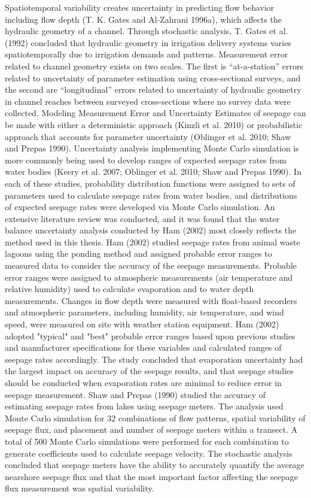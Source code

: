 \begin{linenumbers}
Spatiotemporal variability creates uncertainty in predicting flow behavior including flow depth (T. K. Gates and Al-Zahrani 1996a), which affects the hydraulic geometry of a channel.  Through stochastic analysis, T. Gates et al. (1992) concluded that hydraulic geometry in irrigation delivery systems varies spatiotemporally due to irrigation demands and patterns.
Measurement error related to channel geometry exists on two scales.  The first is “at-a-station” errors related to uncertainty of parameter estimation using cross-sectional surveys, and the second are “longitudinal” errors related to uncertainty of hydraulic geometry in channel reaches between surveyed cross-sections where no survey data were collected.
Modeling Measurement Error and Uncertainty
Estimates of seepage can be made with either a deterministic approach (Kinzli et al. 2010) or probabilistic approach that accounts for parameter uncertainty (Oblinger et al. 2010; Shaw and Prepas 1990).  Uncertainty analysis implementing Monte Carlo simulation is more commonly being used to develop ranges of expected seepage rates from water bodies (Keery et al. 2007; Oblinger et al. 2010; Shaw and Prepas 1990).  In each of these studies, probability distribution functions were assigned to sets of parameters used to calculate seepage rates from water bodies, and distributions of expected seepage rates were developed via Monte Carlo simulation.  
An extensive literature review was conducted, and it was found that the water balance uncertainty analysis conducted by Ham (2002) most closely reflects the method used in this thesis.  Ham (2002) studied seepage rates from animal waste lagoons using the ponding method and assigned probable error ranges to measured data to consider the accuracy of the seepage measurements.  Probable error ranges were assigned to atmospheric measurements (air temperature and relative humidity) used to calculate evaporation and to water depth measurements.  Changes in flow depth were measured with float-based recorders and atmospheric parameters, including humidity, air temperature, and wind speed, were measured on site with weather station equipment.   Ham (2002) adopted "typical" and "best" probable error ranges based upon previous studies and manufacturer specifications for these variables and calculated ranges of seepage rates accordingly.  The study concluded that evaporation uncertainty had the largest impact on accuracy of the seepage results, and that seepage studies should be conducted when evaporation rates are minimal to reduce error in seepage measurement.  
Shaw and Prepas (1990) studied the accuracy of estimating seepage rates from lakes using seepage meters.  The analysis used Monte Carlo simulation for 32 combinations of flow patterns, spatial variability of seepage flux, and placement and number of seepage meters within a transect.  A total of 500 Monte Carlo simulations were performed for each combination to generate coefficients used to calculate seepage velocity.  The stochastic analysis concluded that seepage meters have the ability to accurately quantify the average nearshore seepage flux and that the most important factor affecting the seepage flux measurement was spatial variability.

\end{linenumbers}
